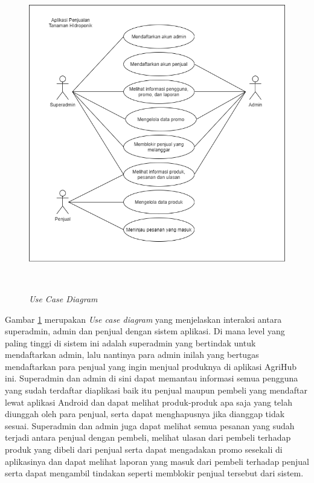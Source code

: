 \begin{figure}[H]
	\centering
	{\includegraphics [width = 13cm, height= 13cm]{gambar/use_case_diagram}}
	\caption{\textit{Use Case Diagram}}
	\label{use_case_diagram}
\end{figure}

\par Gambar \ref*{use_case_diagram} merupakan\textit{ Use case diagram} yang menjelaskan interaksi antara superadmin, admin dan penjual dengan sistem aplikasi. Di mana level yang paling tinggi di sistem ini adalah superadmin yang bertindak untuk mendaftarkan admin, lalu nantinya para admin inilah yang bertugas mendaftarkan para penjual yang ingin menjual produknya di aplikasi AgriHub ini. Superadmin dan admin di sini dapat memantau informasi semua pengguna yang sudah terdaftar diaplikasi baik itu penjual maupun pembeli yang mendaftar lewat aplikasi Android dan dapat melihat produk-produk apa saja yang telah diunggah oleh para penjual, serta dapat menghapusnya jika dianggap tidak sesuai. Superadmin dan admin juga dapat melihat semua pesanan yang sudah terjadi antara penjual dengan pembeli, melihat ulasan dari pembeli terhadap produk yang dibeli dari penjual serta dapat mengadakan promo sesekali di aplikasinya dan dapat melihat laporan yang masuk dari pembeli terhadap penjual serta dapat mengambil tindakan seperti memblokir penjual tersebut dari sistem.

